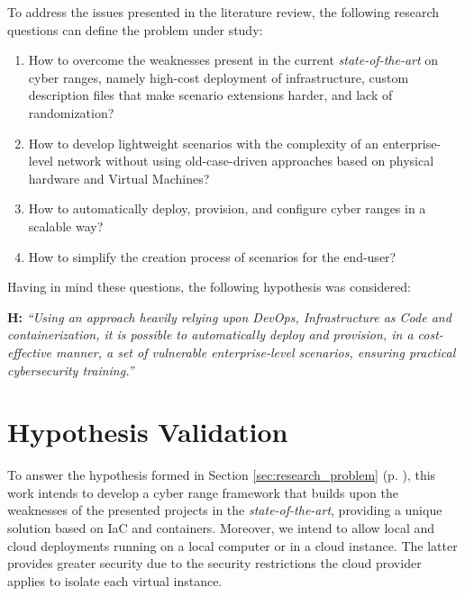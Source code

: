 To address the issues presented in the literature review, the following research questions can define the problem under study:

\begin{enumerate}
    \item How to overcome the weaknesses present in the current \textit{state-of-the-art} on cyber ranges, namely high-cost deployment of infrastructure, custom description files that make scenario extensions harder, and lack of randomization? 
    \item How to develop lightweight scenarios with the complexity of an enterprise-level network without using old-case-driven approaches based on physical hardware and Virtual Machines?
    \item How to automatically deploy, provision, and configure cyber ranges in a scalable way?
    \item How to simplify the creation process of scenarios for the end-user?
\end{enumerate}

Having in mind these questions, the following hypothesis was considered:\\

\leftskip=1.25cm\rightskip=1.25cm

\textbf{H:} \textit{``Using an approach heavily relying upon DevOps, Infrastructure as Code and containerization, it is possible to automatically deploy and provision, in a cost-effective manner, a set of vulnerable enterprise-level scenarios, ensuring practical cybersecurity training.''}

\leftskip=0cm\rightskip=0cm

\section{Hypothesis Validation} \label{sec:hypothesis_validation}

To answer the hypothesis formed in Section \ref{sec:research_problem} (p. \pageref{sec:research_problem}), this work intends to develop a cyber range framework that builds upon the weaknesses of the presented projects in the \textit{state-of-the-art}, providing a unique solution based on IaC and containers. Moreover, we intend to allow local and cloud deployments running on a local computer or in a cloud instance. The latter provides greater security due to the security restrictions the cloud provider applies to isolate each virtual instance.  

